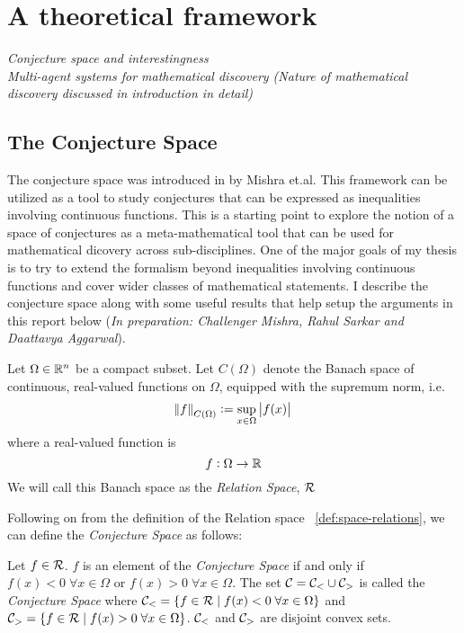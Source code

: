\chapter{A theoretical framework}
\textit{Conjecture space and interestingness}\\
\textit{Multi-agent systems for mathematical discovery (Nature of mathematical discovery discussed in introduction in detail)}

\section{The Conjecture Space}
\label{sec:conj-space}
The conjecture space was introduced in \cite{mishraConjGen2023} by Mishra et.al. This framework can be utilized as a tool to study conjectures that can be expressed as inequalities involving continuous functions. This is a starting point to explore the notion 
of a space of conjectures as a meta-mathematical tool that can be used for mathematical dicovery across sub-disciplines. One of the major goals of my thesis is to try to extend the formalism beyond inequalities involving continuous functions and cover wider classes of mathematical statements. 
I describe the conjecture space along with some useful results that help setup the arguments in this report below (\textit{In preparation: Challenger Mishra, Rahul Sarkar and Daattavya Aggarwal}).

\begin{definition}
    \label{def:space-relations}
    Let $\Omega\in\mathbb{R}^n$ be a compact subset. Let $C(\Omega)$ denote the Banach space of continuous, real-valued functions on $\Omega$, equipped with the supremum norm, i.e.
    \begin{equation*}
        \norm{f}_{C(\Omega)} := \sup_{x\in\Omega} \left|f(x)\right|    
    \end{equation*}
    where a real-valued function is
    \begin{equation*}
        f:\Omega\rightarrow\mathbb{R}
    \end{equation*}
    We will call this Banach space as the \textit{Relation Space}, $\mathcal{R}$
\end{definition}

Following on from the definition of the Relation space ~\ref{def:space-relations}, we can define the \textit{Conjecture Space} as follows:
\begin{definition}
    \label{def:conj-space}
    Let $f\in\mathcal{R}$. $f$ is an element of the \textit{Conjecture Space} if and only if $f(x) < 0 \;\forall x\in\Omega$ or $f(x) > 0 \; \forall x\in\Omega$.
    The set $\mathcal{C} = \mathcal{C}_{<}\cup\mathcal{C}_{>}$ is called the \textit{Conjecture Space} where $\mathcal{C}_{<} = \{f\in\mathcal{R}\;|\; f(x)<0\;\forall x\in\Omega\}$ and $\mathcal{C}_{>} = \{f\in\mathcal{R}\;|\;f(x)>0\;\forall x\in\Omega\}$.
    $\mathcal{C}_{<}$ and $\mathcal{C}_{>}$ are disjoint convex sets.
\end{definition}

